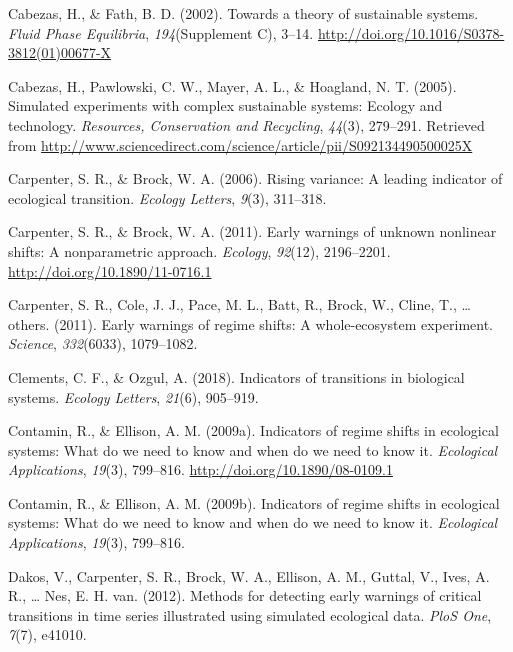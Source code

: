 \documentclass[12pt,twoside,openany]{reedthesis}
\begin{document}
\leavevmode\hypertarget{ref-cabezas_towards_2002}{}%
Cabezas, H., \& Fath, B. D. (2002). Towards a theory of sustainable systems. \emph{Fluid Phase Equilibria}, \emph{194}(Supplement C), 3--14. \url{http://doi.org/10.1016/S0378-3812(01)00677-X}

\leavevmode\hypertarget{ref-cabezas_simulated_2005}{}%
Cabezas, H., Pawlowski, C. W., Mayer, A. L., \& Hoagland, N. T. (2005). Simulated experiments with complex sustainable systems: Ecology and technology. \emph{Resources, Conservation and Recycling}, \emph{44}(3), 279--291. Retrieved from \url{http://www.sciencedirect.com/science/article/pii/S092134490500025X}

\leavevmode\hypertarget{ref-carpenter2006rising}{}%
Carpenter, S. R., \& Brock, W. A. (2006). Rising variance: A leading indicator of ecological transition. \emph{Ecology Letters}, \emph{9}(3), 311--318.

\leavevmode\hypertarget{ref-carpenter_early_2011}{}%
Carpenter, S. R., \& Brock, W. A. (2011). Early warnings of unknown nonlinear shifts: A nonparametric approach. \emph{Ecology}, \emph{92}(12), 2196--2201. \url{http://doi.org/10.1890/11-0716.1}

\leavevmode\hypertarget{ref-carpenter2011early}{}%
Carpenter, S. R., Cole, J. J., Pace, M. L., Batt, R., Brock, W., Cline, T., \ldots{} others. (2011). Early warnings of regime shifts: A whole-ecosystem experiment. \emph{Science}, \emph{332}(6033), 1079--1082.

\leavevmode\hypertarget{ref-clements2018indicators}{}%
Clements, C. F., \& Ozgul, A. (2018). Indicators of transitions in biological systems. \emph{Ecology Letters}, \emph{21}(6), 905--919.

\leavevmode\hypertarget{ref-contamin_indicators_2009}{}%
Contamin, R., \& Ellison, A. M. (2009a). Indicators of regime shifts in ecological systems: What do we need to know and when do we need to know it. \emph{Ecological Applications}, \emph{19}(3), 799--816. \url{http://doi.org/10.1890/08-0109.1}

\leavevmode\hypertarget{ref-contamin2009indicators}{}%
Contamin, R., \& Ellison, A. M. (2009b). Indicators of regime shifts in ecological systems: What do we need to know and when do we need to know it. \emph{Ecological Applications}, \emph{19}(3), 799--816.

\leavevmode\hypertarget{ref-dakos_methods_2012}{}%
Dakos, V., Carpenter, S. R., Brock, W. A., Ellison, A. M., Guttal, V., Ives, A. R., \ldots{} Nes, E. H. van. (2012). Methods for detecting early warnings of critical transitions in time series illustrated using simulated ecological data. \emph{PloS One}, \emph{7}(7), e41010.
\end{document}
